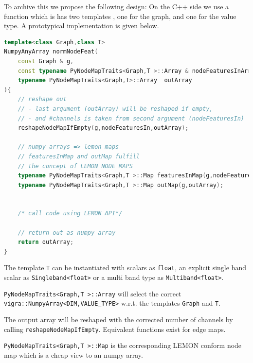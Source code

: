 \begin{minipage}{\textwidth}

To archive this we propose the following design:
On the C++ side we use a function  which
is has two templates , one for the graph, and one for the value type.
A prototypical implementation is given below.

\begin{minipage}{\textwidth}\vspace{-0.75cm}\begin{lstlisting}[language=c++]
template<class Graph,class T>
NumpyAnyArray normNodeFeat(
    const Graph & g,
    const typename PyNodeMapTraits<Graph,T >::Array & nodeFeaturesInArray,
    typename PyNodeMapTraits<Graph,T>::Array  outArray 
){
    // reshape out 
    // - last argument (outArray) will be reshaped if empty,
    // - and #channels is taken from second argument (nodeFeaturesIn) 
    reshapeNodeMapIfEmpty(g,nodeFeaturesIn,outArray);

    // numpy arrays => lemon maps 
    // featuresInMap and outMap fulfill
    // the concept of LEMON NODE MAPS
    typename PyNodeMapTraits<Graph,T >::Map featuresInMap(g,nodeFeaturesInArray);
    typename PyNodeMapTraits<Graph,T >::Map outMap(g,outArray);


    /* call code using LEMON API*/

    // return out as numpy array
    return outArray;
}
\end{lstlisting}\end{minipage}\vspace{0.5cm}

The template \lstinline{T} can be instantiated with scalars as \lstinline{float}, an explicit single band scalar as \lstinline{Singleband<float>}
or a multi band type as \lstinline{Multiband<float>}.

\lstinline{PyNodeMapTraits<Graph,T >::Array} will select the correct \lstinline{vigra::NumpyArray<DIM,VALUE_TYPE>} w.r.t.
the templates \lstinline{Graph} and \lstinline{T}.

The output array will be reshaped with the corrected number of channels by calling \lstinline{reshapeNodeMapIfEmpty}.
Equivalent functions exist for edge maps.

\lstinline{PyNodeMapTraits<Graph,T >::Map} is the corresponding LEMON conform  node map 
which is a cheap view to an numpy array. 
\end{minipage}


